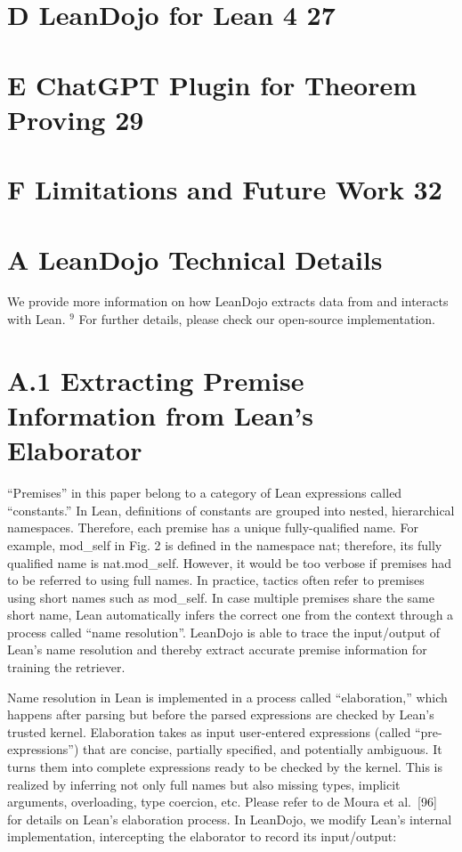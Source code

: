 \documentclass[
]{article}
\begin{document}
\section{D LeanDojo for Lean 4 27}\label{d-leandojo-for-lean-4-27}

\section{E ChatGPT Plugin for Theorem Proving
29}\label{e-chatgpt-plugin-for-theorem-proving-29}

\section{F Limitations and Future Work
32}\label{f-limitations-and-future-work-32}

\section{A LeanDojo Technical
Details}\label{a-leandojo-technical-details}

We provide more information on how LeanDojo extracts data from and
interacts with Lean. \(^{9}\) For further details, please check our
open-source implementation.

\section{A.1 Extracting Premise Information from Lean's
Elaborator}\label{a.1-extracting-premise-information-from-leans-elaborator}

``Premises'' in this paper belong to a category of Lean expressions
called ``constants.'' In Lean, definitions of constants are grouped into
nested, hierarchical namespaces. Therefore, each premise has a unique
fully-qualified name. For example, mod\_self in Fig. 2 is defined in the
namespace nat; therefore, its fully qualified name is nat.mod\_self.
However, it would be too verbose if premises had to be referred to using
full names. In practice, tactics often refer to premises using short
names such as mod\_self. In case multiple premises share the same short
name, Lean automatically infers the correct one from the context through
a process called ``name resolution''. LeanDojo is able to trace the
input/output of Lean's name resolution and thereby extract accurate
premise information for training the retriever.

Name resolution in Lean is implemented in a process called
``elaboration,'' which happens after parsing but before the parsed
expressions are checked by Lean's trusted kernel. Elaboration takes as
input user-entered expressions (called ``pre-expressions'') that are
concise, partially specified, and potentially ambiguous. It turns them
into complete expressions ready to be checked by the kernel. This is
realized by inferring not only full names but also missing types,
implicit arguments, overloading, type coercion, etc. Please refer to de
Moura et al.~{[}96{]} for details on Lean's elaboration process. In
LeanDojo, we modify Lean's internal implementation, intercepting the
elaborator to record its input/output:
\end{document}
